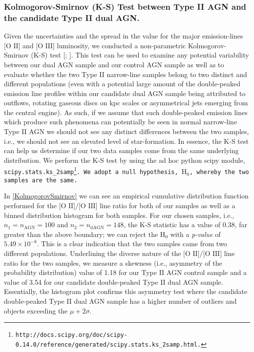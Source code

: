 \subsubsection{Kolmogorov-Smirnov (K-S) Test between Type II AGN and the candidate Type II dual AGN.}

Given the uncertainties and the spread in the value for the major emission-lines $\text{[O II]}$ and $\text{[O III]}$ luminosity, we conducted a non-parametric Kolmogorov-Smirnov (K-S) test [\cite{Peacock_1983}; \cite{Justel_1997}]. This test can be used to examine any potential variability between our dual AGN sample and our control AGN sample as well as to evaluate whether the two Type II narrow-line samples belong to two distinct and different populations (even with a potential large amount of the double-peaked emission line profiles within our candidate dual AGN sample being attributed to outflows, rotating gaseous discs on kpc scales or asymmetrical jets emerging from the central engine). As such, if we assume that such double-peaked emission lines which produce such phenomena can potentially be seen in normal narrow-line Type II AGN we should not see any distinct differences between the two samples, i.e., we should not see an elevated level of star-formation. In essence, the K-S test can help us determine if our two data samples come from the same underlying distribution. We perform the K-S test by using the ad hoc python scipy module, \tt{scipy.stats.ks_2samp}\footnote{\tiny{\tt{http://docs.scipy.org/doc/scipy-0.14.0/reference/generated/scipy.stats.ks_2samp.html}.}}. We adopt a null hypothesis, $\text{H}_{0}$, whereby the two samples are the same.  

In \ref{KolmogorovSmirnov} we can see an empirical cumulative distribution function  performed for the $\text{[O II]}/\text{[O III]}$ line ratio for both of our samples as well as a binned distribution histogram for both samples. For our chosen samples, i.e., $n_{1}=n_{\text{AGN}}=100$ and $n_{2}=n_{\text{dAGN}}=148$, the K-S statistic has a value of $0.38$, far greater than the above boundary; we can reject the $\text{H}_{0}$ with a \textit{p-value} of $5.49\times10^{-8}$. This is a clear indication that the two samples came from two different populations. Underlining the diverse nature of the $\text{[O II]}/\text{[O III]}$ line ratio for the two samples, we measure a skewness (i.e., asymmetry of the probability distribution) value of 1.18 for our Type II AGN control sample and a value of 3.54 for our candidate double-peaked Type II dual AGN sample. Essentially, the histogram plot confirms this asymmetry test where the candidate double-peaked Type II dual AGN sample has a higher number of outliers and objects exceeding the $\mu+{2\sigma}$.
  
  
  
  